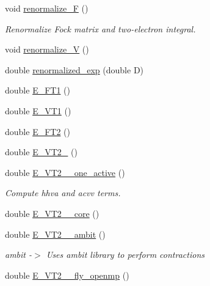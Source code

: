 \begin{DoxyCompactItemize}
\item 
void \mbox{\hyperlink{classforte_1_1_t_h_r_e_e___d_s_r_g___m_r_p_t2_a7adad58b369c8de38ea95e2467ec3e52}{renormalize\+\_\+F}} ()
\begin{DoxyCompactList}\small\item\em Renormalize Fock matrix and two-\/electron integral. \end{DoxyCompactList}\item 
void \mbox{\hyperlink{classforte_1_1_t_h_r_e_e___d_s_r_g___m_r_p_t2_a86afff98fbdf302c3fc1e0b9e077d917}{renormalize\+\_\+V}} ()
\item 
double \mbox{\hyperlink{classforte_1_1_t_h_r_e_e___d_s_r_g___m_r_p_t2_a09b81ed2f10aa65fcca1e93f5e273460}{renormalized\+\_\+exp}} (double D)
\item 
double \mbox{\hyperlink{classforte_1_1_t_h_r_e_e___d_s_r_g___m_r_p_t2_a798de24de98c4abd36983ad428b93031}{E\+\_\+\+F\+T1}} ()
\item 
double \mbox{\hyperlink{classforte_1_1_t_h_r_e_e___d_s_r_g___m_r_p_t2_a1b1e46f4ed3acce7876b2514128d6cf5}{E\+\_\+\+V\+T1}} ()
\item 
double \mbox{\hyperlink{classforte_1_1_t_h_r_e_e___d_s_r_g___m_r_p_t2_a2646f53d2ccfa17dbcab2cb5575f9b7e}{E\+\_\+\+F\+T2}} ()
\item 
double \mbox{\hyperlink{classforte_1_1_t_h_r_e_e___d_s_r_g___m_r_p_t2_a1c25c0d6db9e752c5d034ecee8e4bd70}{E\+\_\+\+V\+T2\+\_}} ()
\item 
double \mbox{\hyperlink{classforte_1_1_t_h_r_e_e___d_s_r_g___m_r_p_t2_a71be38997c0324bacccc29e8a6c0ef3a}{E\+\_\+\+V\+T2\+\_\+\_\+one\+\_\+active}} ()
\begin{DoxyCompactList}\small\item\em Compute hhva and acvv terms. \end{DoxyCompactList}\item 
double \mbox{\hyperlink{classforte_1_1_t_h_r_e_e___d_s_r_g___m_r_p_t2_acca6f85850549bac56fc7d30106dbf1e}{E\+\_\+\+V\+T2\+\_\+\_\+core}} ()
\item 
double \mbox{\hyperlink{classforte_1_1_t_h_r_e_e___d_s_r_g___m_r_p_t2_a003a07b67da8992686e9f082595ae79f}{E\+\_\+\+V\+T2\+\_\+\_\+ambit}} ()
\begin{DoxyCompactList}\small\item\em ambit -\/$>$ Uses ambit library to perform contractions \end{DoxyCompactList}\item 
double \mbox{\hyperlink{classforte_1_1_t_h_r_e_e___d_s_r_g___m_r_p_t2_a6f88bb2cbcaae0c6350142aefb110909}{E\+\_\+\+V\+T2\+\_\+\_\+fly\+\_\+openmp}} ()

\end{DoxyCompactItemize}
